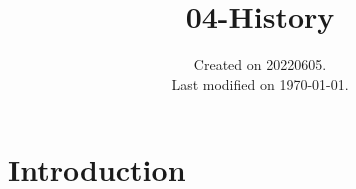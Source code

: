 \documentclass[UTF8]{../RepresentationUniverse}
\begin{document}
\title{04-History}
\date{Created on 20220605.\\   Last modified on \today.}
\maketitle
\tableofcontents


\chapter{Introduction}
\end{document}
